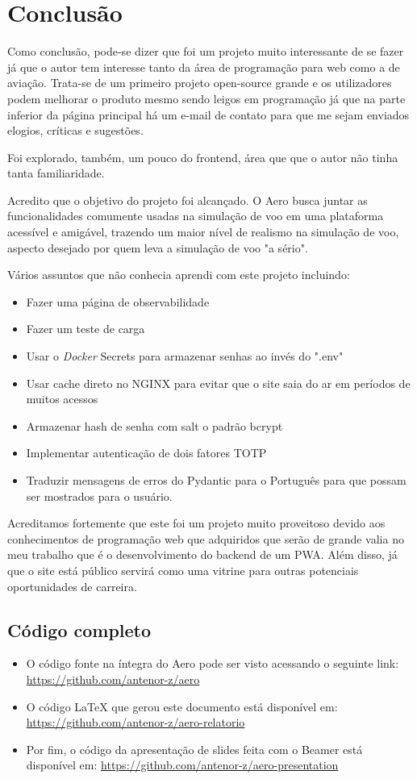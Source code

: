 \chapter{Conclusão}

Como conclusão, pode-se dizer que foi um projeto muito interessante de se fazer já que 
o autor tem interesse tanto da área de programação para web como a de aviação. Trata-se
de um primeiro 
projeto open-source grande e os utilizadores podem melhorar o produto mesmo sendo
leigos em programação já que na parte inferior da página principal há um e-mail 
de contato para que me sejam enviados elogios, críticas e sugestões.

Foi explorado, também, um pouco do frontend, área que que o autor não tinha tanta 
familiaridade.

Acredito que o objetivo do projeto foi alcançado. O Aero busca juntar as funcionalidades 
comumente usadas na simulação de voo em uma plataforma acessível e amigável, 
trazendo um maior nível de realismo na simulação de voo, aspecto desejado por quem leva
a simulação de voo "a sério".

Vários assuntos que não conhecia aprendi com este projeto incluindo:

\begin{itemize}
\item Fazer uma página de observabilidade
\item Fazer um teste de carga
\item Usar o \textit{Docker} Secrets para armazenar senhas ao invés do ".env"
\item Usar cache direto no NGINX para evitar que o site saia do ar em períodos 
de muitos acessos
\item Armazenar hash de senha com salt o padrão bcrypt
\item Implementar autenticação de dois fatores TOTP
\item Traduzir mensagens de erros do Pydantic para o Português para que possam 
ser mostrados para o usuário.
\end{itemize}

Acreditamos fortemente que este foi um projeto muito proveitoso devido aos 
conhecimentos de programação web que adquiridos que serão de grande valia no meu 
trabalho que é o desenvolvimento do backend de um PWA. Além disso, já que o site está público 
servirá como uma vitrine para outras potenciais oportunidades de carreira.

\section {Código completo}

\begin{itemize}
\item O código fonte na íntegra do Aero pode ser visto acessando o seguinte link: \url{https://github.com/antenor-z/aero}
\item O código LaTeX que gerou este documento está disponível em: \url{https://github.com/antenor-z/aero-relatorio}
\item Por fim, o código da apresentação de slides feita com o Beamer está disponível em: \url{https://github.com/antenor-z/aero-presentation}
\end{itemize}
